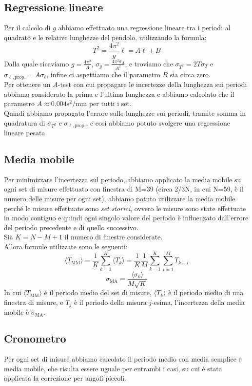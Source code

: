 \subsection*{Regressione lineare}
Per il calcolo di $g$ abbiamo effettuato una regressione lineare tra i periodi al quadrato e le relative lunghezze del pendolo, utilizzando la formula: 
$$T^2 = \frac{4\pi^2}{g}\ell = A\ell + B$$
Dalla quale ricaviamo $g = \frac{4 \pi^2}{A}$, $\sigma_g = \frac{4\pi^2 \sigma_A}{A^2}$, e troviamo che $\sigma_{T^2} = 2T\sigma_T$ e $\sigma_{\ell, \text{prop.}} = A\sigma_\ell$, infine ci aspettiamo che il parametro $B$ sia circa zero.\\
Per ottenere un $A$-test con cui propagare le incertezze della lunghezza sui periodi abbiamo considerato la prima e l'ultima lunghezza e abbiamo calcolato che il parametro $A \approx 0.004\text{s}^2/\text{mm}$ per tutti i set.\\
Quindi abbiamo propagato l'errore sulle lunghezze sui periodi, tramite somma in quadratura di $\sigma_{T^2}$ e $\sigma_{\ell, \text{prop.}}$, e così abbiamo potuto svolgere una regressione lineare pesata.\\


\subsection*{Media mobile}
Per minimizzare l’incertezza sul periodo, abbiamo applicato la media mobile su ogni set di misure effettuato con finestra di M=39 (circa 2/3N, in cui N=59, è il numero delle misure per ogni set), abbiamo potuto utilizzare la media mobile perché le misure effettuate sono \textit{set storici}, ovvero le misure sono state effettuate in modo contiguo e quindi ogni singolo valore del periodo è influenzato dall'errore del periodo precedente e di quello successivo.\\
Sia $K = N - M +1$ il numero di finestre considerate.\\
Allora formule utilizzate sono le seguenti:
$$\langle T_\text{MM} \rangle = \frac{1}{K}\sum_{k=1}^{K}\langle T_k\rangle = 
\frac{1}{K}\frac{1}{M}\sum_{k=1}^{K}\sum_{i=1}^{M} T_{k+i} $$
$$\sigma_\text{MA} = \frac{\langle \sigma_k \rangle}{M\sqrt{K}}$$
In cui $\langle T_\text{MM} \rangle$ è il periodo medio del set di misure, $\langle T_k\rangle$ è il periodo medio di una finestra di misure, e $T_j$ è il periodo della misura $j$-esima, l'incertezza della media mobile è $\sigma_\text{MA}$.\\


\subsection{Cronometro}
Per ogni set di misure abbiamo calcolato il periodo medio con media semplice e media mobile, che risulta essere uguale per entrambi i casi, su cui è stata applicata la correzione per angoli piccoli.\\

